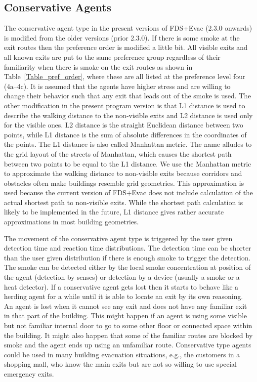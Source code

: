 \documentclass[12pt,a4paper,final,twoside]{stylevk}
\begin{document}
\subsection{Conservative Agents}\label{Sec_ConservativeAgents}

\noindent The conservative agent type in the present versions of
FDS+Evac (2.3.0 onwards) is modified from the older versions (prior
2.3.0).  If there is some smoke at the exit routes then the preference
order is modified a little bit.  All visible exits and all known exits
are put to the same preference group regardless of their familiarity
when there is smoke on the exit routes as shown in
Table~\ref{Table_pref_order}, where these are all listed at the
preference level four (4a--4c).  It is assumed that the agents have
higher stress and are willing to change their behavior such that any
exit that leads out of the smoke is used.  The other modification in
the present program version is that L1 distance is used to describe
the walking distance to the non-visible exits and L2 distance is used
only for the visible ones.  L2 distance is the straight Euclidean
distance between two points, while L1 distance is the sum of absolute
differences in the coordinates of the points.  The L1 distance is also
called Manhattan metric.  The name alludes to the grid layout of the
streets of Manhattan, which causes the shortest path between two
points to be equal to the L1 distance.  We use the Manhattan metric to
approximate the walking distance to non-visible exits because
corridors and obstacles often make buildings resemble grid geometries.
This approximation is used because the current version of FDS+Evac
does not include calculation of the actual shortest path to
non-visible exits.  While the shortest path calculation is likely to
be implemented in the future, L1 distance gives rather accurate
approximations in most building geometries.


The movement of the conservative agent type is triggered by the user
given detection time and reaction time distributions.  The detection
time can be shorter than the user given distribution if there is
enough smoke to trigger the detection.  The smoke can be detected
either by the local smoke concentration at position of the agent
(detection by senses) or detection by a device (usually a smoke or a
heat detector).  If a conservative agent gets lost then it starts to
behave like a herding agent for a while until it is able to locate an
exit by its own reasoning.  An agent is lost when it cannot see any
exit and does not have any familiar exit in that part of the building.
This might happen if an agent is using some visible but not familiar
internal door to go to some other floor or connected space within the
building.  It might also happen that some of the familiar routes are
blocked by smoke and the agent ends up using an unfamiliar route.
Conservative type agents could be used in many building evacuation
situations, e.g., the customers in a shopping mall, who know the main
exits but are not so willing to use special emergency exits.
\end{document}
